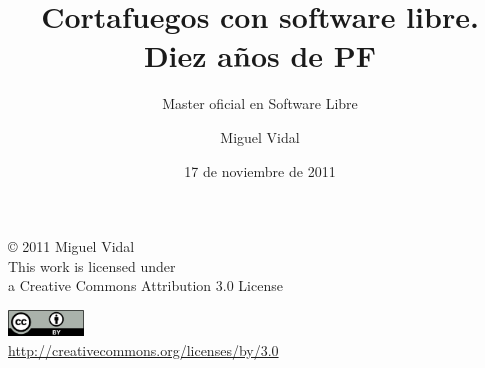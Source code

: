 \documentclass{beamer}
\begin{document}
\title{Cortafuegos con software libre. Diez años de PF}
\subtitle{Master oficial en Software Libre}
\author{Miguel Vidal} 
\date{17 de noviembre de 2011}


\begin{frame}
  \vspace{2cm}
  \begin{flushright}
    {\small \copyright{} 2011 Miguel Vidal} \\
    \medskip
    {\scriptsize This work is licensed under \\ a Creative Commons Attribution 3.0 License}
  \end{flushright}
  \begin{flushright}
    \href{http://creativecommons.org/licenses/by/3.0/es}{\includegraphics[width=2cm]{format/cc-by.png}} \\
    {\tiny \url{http://creativecommons.org/licenses/by/3.0}}
  \end{flushright}
\end{frame}%


\usebackgroundtemplate{}



\end{document}
